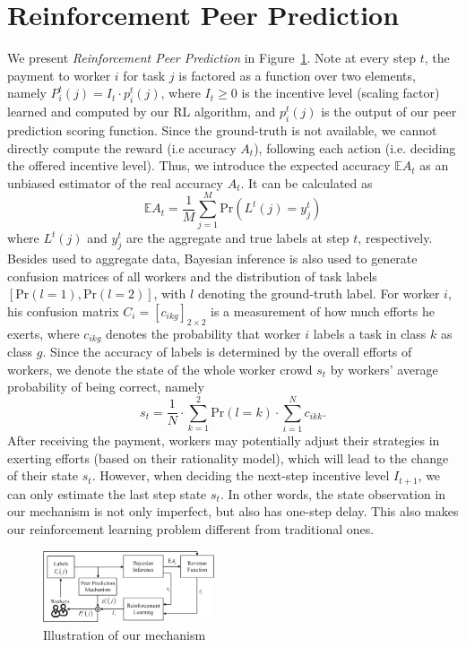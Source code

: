 \documentclass[letterpaper]{article} %
\begin{document}
\section{Reinforcement Peer Prediction}
We present \emph{Reinforcement Peer Prediction} in Figure~\ref{ED1}. Note at every step $t$, the payment to worker $i$ for task $j$ is factored as a function over two elements, namely $P^{t}_i(j)=I_t \cdot p^{t}_i(j)$, where $I_t\geq 0$ is the incentive level (scaling factor) learned and computed by our RL algorithm, and
$p^t_i(j)$ is the output of our peer prediction scoring function.
Since the ground-truth is not available, we cannot directly compute the reward (i.e accuracy $A_t$), following each action (i.e. deciding the offered incentive level). 
Thus, we introduce the expected accuracy $\mathbb{E}A_t$ as an unbiased estimator of the real accuracy $A_t$.
It can be calculated as
\begin{equation}
\mathbb{E}A_t = \frac{1}{M}{\sum}_{j=1}^{M} \textrm{Pr}(L^{t}(j) = y^{t}_j)
\end{equation}
where $L^{t}(j)$ and $y^{t}_j$ are the aggregate and true labels at step $t$, respectively. Besides used to aggregate data, Bayesian inference is also used to generate confusion matrices of all workers and the distribution of task labels $\left[\textrm{Pr}(l=1), \textrm{Pr}(l=2)\right]$, with $l$ denoting the ground-truth label.
For worker $i$, his confusion matrix $C_i = [c_{ikg}]_{2\times 2}$ is a measurement of how much efforts he exerts, where $c_{ikg}$ denotes the probability that worker $i$ labels a task in class $k$ as class $g$. Since the accuracy of labels is determined by the overall efforts of workers, we denote the state of the whole worker crowd $s_t$ by workers' average probability of being correct, namely
\begin{equation}
s_t =\frac{1}{N}\cdot {\sum}_{k=1}^2\textrm{Pr}(l=k)\cdot  {\sum}_{i=1}^{N}c_{ikk}.
\end{equation}
After receiving the payment, workers may potentially adjust their strategies in exerting efforts (based on their rationality model), which will lead to the change of their state $s_t$.
However, when deciding the next-step incentive level $I_{t+1}$, we can only estimate the last step state $s_t$.
In other words, the state observation in our mechanism is not only imperfect, but also has one-step delay. This also makes our reinforcement learning problem different from traditional ones.
\begin{figure}[!htb]
        \includegraphics[width=0.45\textwidth]{image/Mechanism}
        \caption{\label{ED1} Illustration of our mechanism}
\end{figure}
\end{document}
